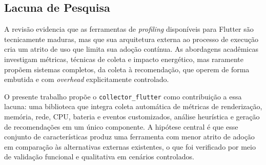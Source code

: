 \subsection*{Lacuna de Pesquisa}

A revisão evidencia que as ferramentas de \textit{profiling} disponíveis para Flutter são tecnicamente maduras, mas que sua arquitetura externa ao processo de execução cria um atrito de uso que limita sua adoção contínua. As abordagens acadêmicas investigam métricas, técnicas de coleta e impacto energético, mas raramente propõem sistemas completos, da coleta à recomendação, que operem de forma embutida e com \textit{overhead} explicitamente controlado.

O presente trabalho propõe o \texttt{collector\_flutter} como contribuição a essa lacuna: uma biblioteca que integra coleta automática de métricas de renderização, memória, rede, CPU, bateria e eventos customizados, análise heurística e geração de recomendações em um único componente. A hipótese central é que esse conjunto de características produz uma ferramenta com menor atrito de adoção em comparação às alternativas externas existentes, o que foi verificado por meio de validação funcional e qualitativa em cenários controlados.

